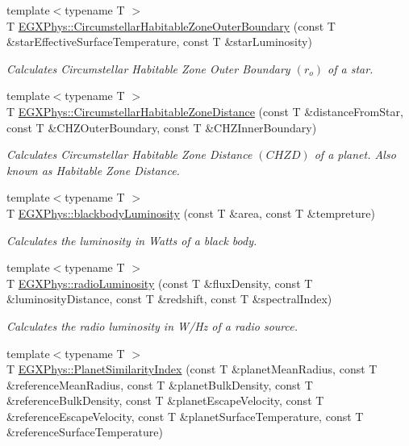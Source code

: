 \begin{DoxyCompactItemize}
{\footnotesize template$<$typename T $>$ }\\T \mbox{\hyperlink{group___astrophysics_gaa47fcde814ba8007de800e930fc0a08d}{E\+G\+X\+Phys\+::\+Circumstellar\+Habitable\+Zone\+Outer\+Boundary}} (const T \&star\+Effective\+Surface\+Temperature, const T \&star\+Luminosity)
\begin{DoxyCompactList}\small\item\em Calculates Circumstellar Habitable Zone Outer Boundary $(r_o)$ of a star. \end{DoxyCompactList}\item 
{\footnotesize template$<$typename T $>$ }\\T \mbox{\hyperlink{group___astrophysics_gacf3a720793cdb27f6d93b170b44e81be}{E\+G\+X\+Phys\+::\+Circumstellar\+Habitable\+Zone\+Distance}} (const T \&distance\+From\+Star, const T \&C\+H\+Z\+Outer\+Boundary, const T \&C\+H\+Z\+Inner\+Boundary)
\begin{DoxyCompactList}\small\item\em Calculates Circumstellar Habitable Zone Distance $(CHZD)$ of a planet. Also known as Habitable Zone Distance. \end{DoxyCompactList}\item 
{\footnotesize template$<$typename T $>$ }\\T \mbox{\hyperlink{group___astrophysics_ga909f82edfaed449b44e94788b642ebb8}{E\+G\+X\+Phys\+::blackbody\+Luminosity}} (const T \&area, const T \&tempreture)
\begin{DoxyCompactList}\small\item\em Calculates the luminosity in Watts of a black body. \end{DoxyCompactList}\item 
{\footnotesize template$<$typename T $>$ }\\T \mbox{\hyperlink{group___astrophysics_ga6d6865b2aac1bc7c7f06b7c4ac2444e4}{E\+G\+X\+Phys\+::radio\+Luminosity}} (const T \&flux\+Density, const T \&luminosity\+Distance, const T \&redshift, const T \&spectral\+Index)
\begin{DoxyCompactList}\small\item\em Calculates the radio luminosity in W/\+Hz of a radio source. \end{DoxyCompactList}\item 
{\footnotesize template$<$typename T $>$ }\\T \mbox{\hyperlink{group___astrophysics_ga62e8b781c301df60bd04af3183a965eb}{E\+G\+X\+Phys\+::\+Planet\+Similarity\+Index}} (const T \&planet\+Mean\+Radius, const T \&reference\+Mean\+Radius, const T \&planet\+Bulk\+Density, const T \&reference\+Bulk\+Density, const T \&planet\+Escape\+Velocity, const T \&reference\+Escape\+Velocity, const T \&planet\+Surface\+Temperature, const T \&reference\+Surface\+Temperature)

\end{DoxyCompactItemize}
